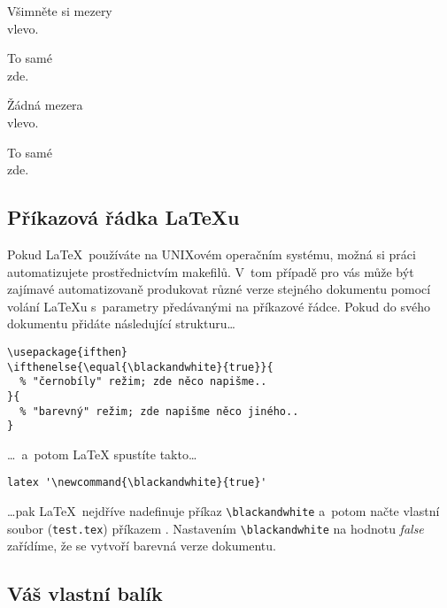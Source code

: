 \begin{example}
\newenvironment{jednoduche}%
 {\noindent}%
 {\par\noindent}

\begin{jednoduche}
Všimněte si mezery\\vlevo.
\end{jednoduche}
To samé\\zde.
\end{example}

\begin{example}
\newenvironment{spravne}%
 {\noindent\ignorespaces}%
 {\par\noindent%
   \ignorespacesafterend}

\begin{spravne}
Žádná mezera\\vlevo.
\end{spravne}
To samé\\zde.
\end{example}

\subsection{Příkazová řádka \LaTeX u}
Pokud \LaTeX\ používáte na UNIXovém operačním systému, možná si práci
automatizujete prostřednictvím makefilů. V~tom případě pro vás může
být zajímavé automatizovaně produkovat různé verze stejného dokumentu
pomocí volání \LaTeX u s~parametry předávanými na příkazové řádce.
Pokud do svého dokumentu přidáte následující strukturu\dots

\begin{verbatim}
\usepackage{ifthen}
\ifthenelse{\equal{\blackandwhite}{true}}{
  % "černobíly" režim; zde něco napišme..
}{
  % "barevný" režim; zde napišme něco jiného..
}
\end{verbatim}

\dots\ a~potom \LaTeX{} spustíte takto\dots
\begin{verbatim}
latex '\newcommand{\blackandwhite}{true}'
\end{verbatim}

\dots pak \LaTeX\ nejdříve nadefinuje příkaz \verb|\blackandwhite| a~potom 
načte vlastní soubor (\verb+test.tex+) příkazem . Nastavením \verb|\blackandwhite|
na hodnotu \emph{false} zařídíme, že se vytvoří barevná verze dokumentu.

\subsection{Váš vlastní balík}

